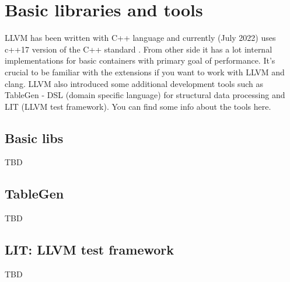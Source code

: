 \chapter{Basic libraries and tools}
LLVM has been written with C++ language and currently (July 2022) uses c++17
version of the C++ standard \cite{llvm:cpp17migration}. From other side it has a
lot internal implementations for basic containers with primary goal of
performance. It's crucial to be familiar with the extensions if you want to work
with LLVM and clang. LLVM also introduced some additional development tools such
as TableGen - DSL (domain specific language) for structural data processing and
LIT (LLVM test framework). You can find some info about the tools here. 

\section{Basic libs}
TBD

\section{TableGen}
TBD

\section{LIT: LLVM test framework}
TBD
